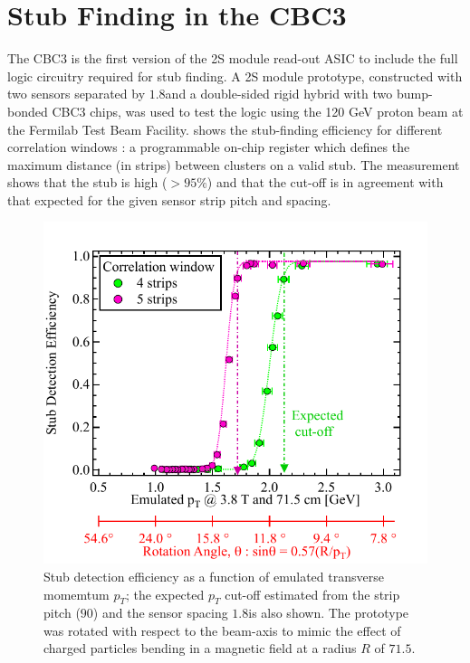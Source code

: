 \section{Stub Finding in the CBC3}
The CBC3 is the first version of the 2S module read-out ASIC to include the full logic circuitry required for stub finding. A 2S module prototype, constructed with two sensors separated by ${1.8}$\mm and a double-sided rigid hybrid with two bump-bonded CBC3 chips, was used to test the logic using the 120 GeV proton beam at the Fermilab Test Beam Facility.  shows the stub-finding efficiency for different correlation windows : a programmable on-chip register which defines the maximum distance (in strips) between clusters on a valid stub. The measurement shows that the stub is high (${>95\%}$) and that the cut-off is in agreement with that expected for the given sensor strip pitch and spacing.


\begin{figure}[!htbp]
\centering
\includegraphics[width=0.9\linewidth]{Figures/StubScan.pdf}
\vspace*{-2mm}
\caption{Stub detection efficiency as a function of emulated transverse momemtum ${p_T}$; the expected ${p_T}$ cut-off estimated from the strip pitch (${90}$\microns) and the sensor spacing ${1.8}$\mm is also shown. The prototype was rotated with respect to the beam-axis to mimic the effect of charged particles bending in a magnetic field at a radius $R$ of ${71.5}$\cm.}
\label{fig:stubs}
\end{figure}
